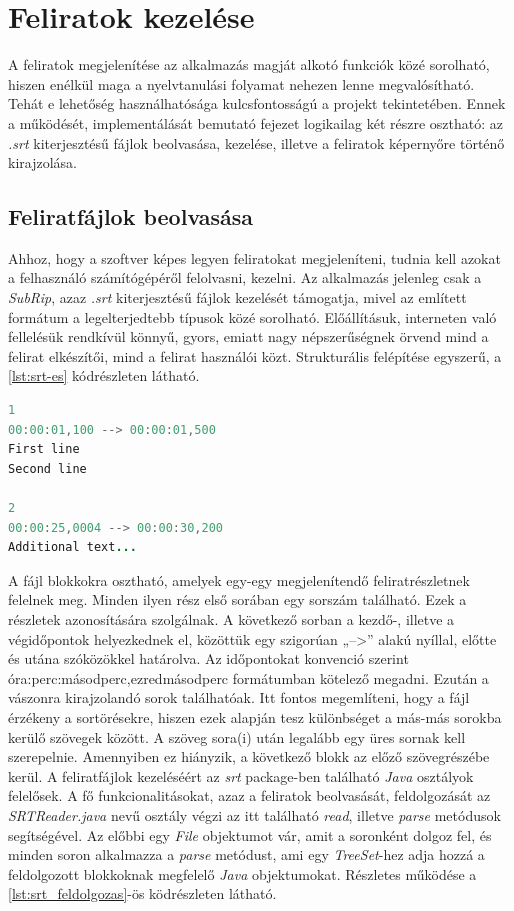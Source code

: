 \section{Feliratok kezelése}
A feliratok megjelenítése az alkalmazás magját alkotó funkciók közé sorolható, hiszen enélkül maga a nyelvtanulási folyamat nehezen lenne megvalósítható. Tehát e lehetőség használhatósága kulcsfontosságú a projekt tekintetében. Ennek a működését, implementálását bemutató fejezet logikailag két részre osztható: az \textit{.srt} kiterjesztésű fájlok beolvasása, kezelése, illetve a feliratok képernyőre történő kirajzolása.

\subsection{Feliratfájlok beolvasása}
Ahhoz, hogy a szoftver képes legyen feliratokat megjeleníteni, tudnia kell azokat a felhasználó számítógépéről felolvasni, kezelni. Az alkalmazás jelenleg csak a \textit{SubRip}, azaz \textit{.srt} kiterjesztésű fájlok kezelését támogatja, mivel az említett formátum a legelterjedtebb típusok közé sorolható. Előállításuk, interneten való fellelésük rendkívül könnyű, gyors, emiatt nagy népszerűségnek örvend mind a felirat elkészítői, mind a felirat használói közt. Strukturális felépítése egyszerű, a \ref{lst:srt-es} kódrészleten látható.

\begin{spacing}{1.25}
\begin{lstlisting}[language=java, caption=A .srt kiterjesztésű fájlok felépítése, label={lst:srt}]
1
00:00:01,100 --> 00:00:01,500
First line
Second line
 
2 
00:00:25,0004 --> 00:00:30,200 
Additional text...
\end{lstlisting}
\end{spacing}

A fájl blokkokra osztható, amelyek egy-egy megjelenítendő feliratrészletnek felelnek meg. Minden ilyen rész első sorában egy sorszám található. Ezek a részletek azonosítására szolgálnak. A következő sorban a kezdő-, illetve a végidőpontok helyezkednek el, közöttük egy szigorúan „-->” alakú nyíllal, előtte és utána szóközökkel határolva. Az időpontokat konvenció szerint óra:perc:másodperc,ezredmásodperc formátumban kötelező megadni. Ezután a vászonra kirajzolandó sorok találhatóak. Itt fontos megemlíteni, hogy a fájl érzékeny a sortörésekre, hiszen ezek alapján tesz különbséget a más-más sorokba kerülő szövegek között. A szöveg sora(i) után legalább egy üres sornak kell szerepelnie. Amennyiben ez hiányzik, a következő blokk az előző szövegrészébe kerül.
A feliratfájlok kezeléséért az \textit{srt} package-ben található \textit{Java} osztályok felelősek. A fő funkcionalitásokat, azaz a feliratok beolvasását, feldolgozását az \textit{SRTReader.java} nevű osztály végzi az itt található \textit{read}, illetve \textit{parse} metódusok segítségével. Az előbbi egy \textit{File} objektumot vár, amit a soronként dolgoz fel, és minden soron alkalmazza a \textit{parse} metódust, ami egy \textit{TreeSet}-hez adja hozzá a feldolgozott blokkoknak megfelelő \textit{Java} objektumokat. Részletes működése a \ref{lst:srt_feldolgozas}-ös ködrészleten látható.

